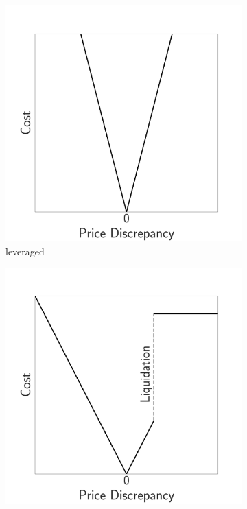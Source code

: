 \documentclass[11pt]{article}
\begin{document}
\begin{figure}[!t]
     \begin{subfigure}{0.38\textwidth}
         \centering
         \includegraphics[width=\textwidth]{fig/use-case-leveraged.pdf}
         \caption{leveraged}
         \label{fig:use-case-leveraged}
     \end{subfigure}
     \begin{subfigure}{0.38\textwidth}
         \centering
         \includegraphics[width=\textwidth]{fig/use-case-discontinuous.pdf}

\end{subfigure}
\end{figure}
\end{document}
